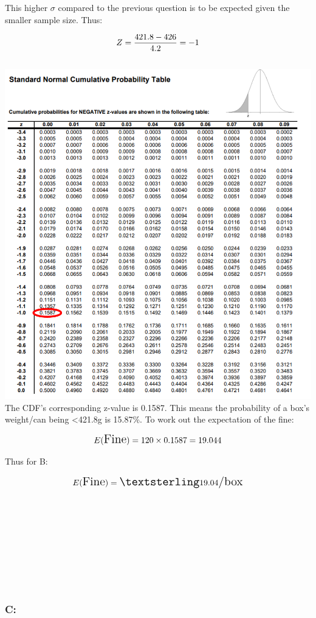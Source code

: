 \documentclass[
]{article}
\begin{document}
This higher \(\sigma\) compared to the previous question is to be
expected given the smaller sample size. Thus:

\[
\Large
Z = \frac{421.8 - 426}{4.2} = -1
\]\\

\includegraphics{images/ztableb.png}\\

The CDF's corresponding z-value is 0.1587. This means the probability of
a box's weight/can being \textless421.8g is 15.87\%. To work out the
expectation of the fine:

\[
\Large
E(\text{Fine}) = 120 \times 0.1587 = 19.044
\]

Thus for B:

\[
\Large
E(\text{Fine})=£19.04\text{/box}
\]\\
\strut \\
\strut \\
\strut \\
\strut \\

\subsubsection{C:}\label{c}
\end{document}
